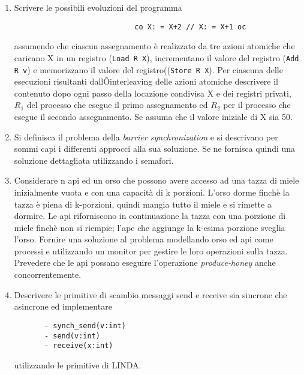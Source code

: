 
\begin{enumerate}
\medskip
\item 
Scrivere le possibili evoluzioni del programma 
\begin{verbatim}
                       		co X: = X+2 // X: = X+1 oc
\end{verbatim}
assumendo che ciascun assegnamento è realizzato da tre azioni atomiche che
caricano X in un registro (\verb"Load R X"), incrementano il valore del registro (\verb"Add R v") e memorizzano il valore del registro((\verb"Store R X"). Per ciascuna delle esecuzioni risultanti dallÕinterleaving delle azioni atomiche descrivere il contenuto dopo ogni passo della locazione condivisa X e dei registri privati,  $R_1$ del processo che esegue il primo assegnamento ed  $R_2$  per il processo che esegue il secondo assegnamento. Se assuma che il valore iniziale di X sia 50.
\medskip
\item
Si definisca il problema della \emph{barrier synchronization} e si descrivano per sommi capi i differenti approcci alla sua soluzione. Se ne fornisca quindi una soluzione dettagliata utilizzando i semafori.
\medskip
\item
Considerare n api ed un orso che possono avere accesso ad una tazza di miele
inizialmente  vuota e con una capacità di k porzioni. L'orso dorme finchè la
tazza è piena di k-porzioni,  quindi mangia tutto il miele e si rimette a
dormire. Le api riforniscono in continuazione la  tazza con una porzione di
miele finchè non si riempie; l'ape che aggiunge la k-esima porzione sveglia
l'orso. Fornire una soluzione al problema modellando orso ed api come  processi
e utilizzando un monitor per gestire le loro operazioni sulla tazza. Prevedere che le api possano eseguire l'operazione \emph{produce-honey} anche concorrentemente.
 \medskip
 \item  Descrivere le primitive di scambio messaggi send e receive sia sincrone che asincrone ed implementare
 \vspace{-0.5cm}
 \begin{verbatim}
       - synch_send(v:int)
       - send(v:int)
       - receive(x:int)
\end{verbatim}
 \vspace{-0.3cm}
utilizzando le primitive di LINDA.

\end{enumerate}
